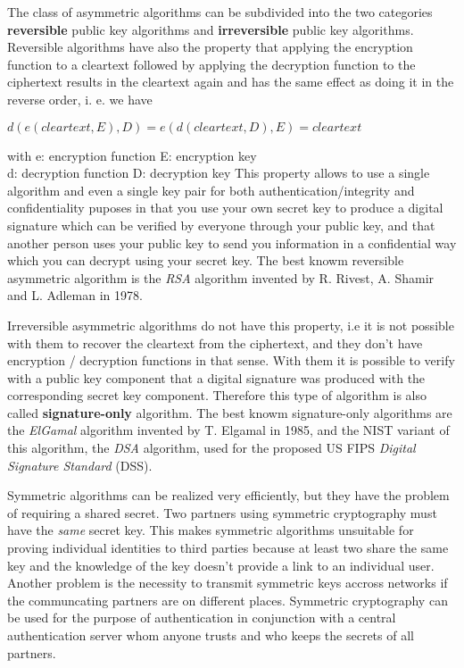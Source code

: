 The class of asymmetric algorithms can be subdivided into the two categories {\bf reversible}
public key algorithms and {\bf irreversible} public key algorithms.  Reversible algorithms
have also the property that applying the encryption function to a cleartext followed by 
applying the decryption function to the ciphertext results in the cleartext again and has
the same effect as doing it in the reverse order, i. e. we have
\begin{center}
$d(e(cleartext, E), D) = e(d(cleartext, D), E) = cleartext$
\end{center}
{\small
\bvtab
\1 with \3 e: encryption function \7 E: encryption key \\
\4         d: decryption function \7 D: decryption key
\evtab
}
This property allows to use a single algorithm and even a single key pair for both
authentication/integrity and confidentiality puposes in that you use your own secret
key to produce a digital signature which can be verified by everyone through your
public key, and that another person uses your public key to send you information
in a confidential way which you can decrypt using your secret key. 
The best knowm reversible asymmetric algorithm
is the {\em RSA} algorithm invented by R. Rivest, A. Shamir and L. Adleman in 1978.

Irreversible asymmetric algorithms do not have this property, i.e it is not possible
with them to recover the cleartext from the ciphertext, and they don't have encryption / decryption
functions in that sense. With them it is possible to verify with a public key component that
a digital signature was produced with the corresponding secret key component. Therefore this type 
of algorithm is also called {\bf signature-only} algorithm. The best knowm signature-only algorithms
are the {\em ElGamal} algorithm invented by T. Elgamal in 1985, and the NIST variant 
of this algorithm, the {\em DSA} algorithm, used for the proposed US FIPS {\em Digital Signature Standard} (DSS).  

Symmetric algorithms can be realized very efficiently, but they have the problem of requiring
a shared secret. Two partners using symmetric cryptography must have the {\em same} secret
key. This makes symmetric algorithms unsuitable for proving individual identities to 
third parties because at least two share the same key and the knowledge of the key doesn't
provide a link to an individual user. Another problem is the necessity to transmit
symmetric keys accross networks if the communcating partners are on different places.
Symmetric cryptography can be used for the purpose of authentication
in conjunction with a central authentication server whom anyone trusts and who keeps the secrets of
all partners.

